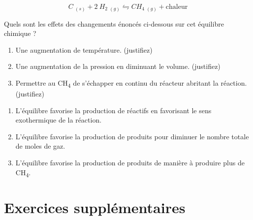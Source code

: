 \documentclass[
  11pt,
  a4paper,
  openany]{book}
\providecommand{\tightlist}{%
  \setlength{\itemsep}{0pt}\setlength{\parskip}{0pt}}
\begin{document}
\clearpage

\begin{Exercise}

\[
  C\ _{(s)} + 2\ H_2\ _{(g)} \leftrightharpoons CH_4\ _{(g)} + \text{chaleur}
\]

Quels sont les effets des changements énoncés ci-dessous sur cet équilibre chimique ?

\begin{enumerate}
\def\labelenumi{\alph{enumi}.}
\tightlist
\item
  Une augmentation de température. (justifiez)
\item
  Une augmentation de la pression en diminuant le volume. (justifiez)
\item
  Permettre au CH\textsubscript{4} de s'échapper en continu du réacteur abritant la réaction. (justifiez)
\end{enumerate}

\end{Exercise}

\begin{Answer}

\begin{enumerate}
\def\labelenumi{\alph{enumi}.}
\tightlist
\item
  L'équilibre favorise la production de réactifs en favorisant le sens exothermique de la réaction.
\item
  L'équilibre favorise la production de produits pour diminuer le nombre totale de moles de gaz.
\item
  L'équilibre favorise la production de produits de manière à produire plus de CH\textsubscript{4}.
\end{enumerate}

\end{Answer}

\section{Exercices supplémentaires}\label{exercices-suppluxe9mentaires-12}
\end{document}
